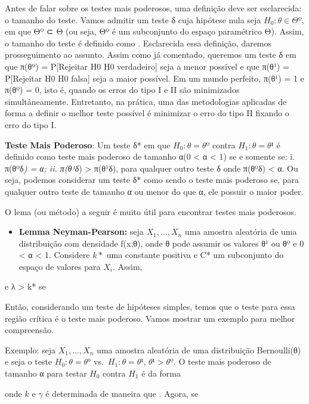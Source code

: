 \documentclass[
]{article}
\begin{document}
Antes de falar sobre os testes mais poderosos, uma definição deve ser
esclarecida: o tamanho do teste. Vamos admitir um teste δ cuja hipótese
nula seja \(H_0: θ ∈ Θº\), em que Θº ⊂ Θ (ou seja, Θº é um subconjunto
do espaço paramétrico Θ). Assim, o tamanho do teste é definido como .
Esclarecida essa definição, daremos prosseguimento ao assunto. Assim
como já comentado, queremos um teste δ em que π(θº) = P{[}Rejeitar H0
\textbar{} H0 verdadeiro{]} seja a menor possível e que π(θ¹) =
P{[}Rejeitar H0 \textbar{} H0 falsa{]} seja a maior possível. Em um
mundo perfeito, π(θ¹) = 1 e π(θº) = 0, isto é, quando os erros do tipo I
e II são minimizados simultâneamente. Entretanto, na prática, uma das
metodologias aplicadas de forma a definir o melhor teste possível é
minimizar o erro do tipo II fixando o erro do tipo I.

\textbf{Teste Mais Poderoso}: Um teste δ* em que \(H_0: θ = θº\) contra
\(H_1: θ = θ¹\) é definido como teste mais poderoso de tamanho α(0
\textless{} α \textless{} 1) se e somente se: i. π(θº\textbar δ\emph{) =
α; ii. π(θ¹\textbar δ}) \textgreater{} π(θ¹\textbar δ), para qualquer
outro teste δ onde π(θº\textbar δ) \textless{} α. Ou seja, podemos
considerar um teste δ* como sendo o teste mais poderoso se, para
qualquer outro teste de tamanho α ou menor do que α, ele possuir o maior
poder.

O lema (ou método) a seguir é muito útil para encontrar testes mais
poderosos.

\begin{itemize}
\item
  \textbf{Lemma Neyman-Pearson:} seja \(X_1,...,X_n\) uma amostra
  aleatória de uma distribuição com densidade f(x;θ), onde θ pode
  assumir os valores θ¹ ou θº e 0 \textless{} α \textless{} 1. Considere
  \(k*\) uma constante positiva e C* um subconjunto do espaço de valores
  para \(X_i\). Assim,
\end{itemize}

e λ \textgreater{} k* se

Então, considerando um teste de hipóteses simples, temos que o teste
para essa região crítica é o teste mais poderoso. Vamos mostrar um
exemplo para melhor compreensão.

Exemplo: seja \(X_1,...,X_n\) uma amostra aleatória de uma distribuição
Bernoulli(θ) e seja o teste \(H_0:θ = θ°\) vs.~\(H_1: θ = θ¹\),
\(θ¹ > θº\). O teste mais poderoso de tamanho α para testar \(H_0\)
contra \(H_1\) é da forma

onde \(k\) e \(γ\) é determinada de maneira que . Agora, se
\end{document}
